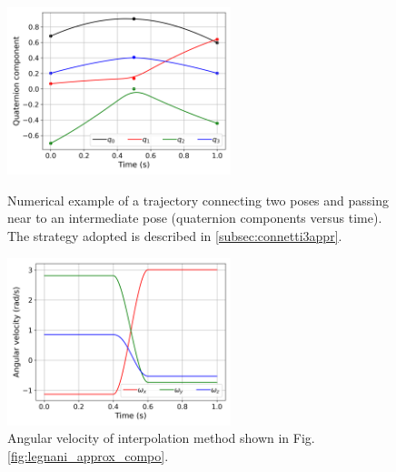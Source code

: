 \begin{figure}[tbp]
    \begin{minipage}[t]{0.49\textwidth}
        \centering
        \includegraphics[width=6.5cm]{figures/legnani_approx_compo.png}
        \caption{Numerical example of a trajectory connecting two poses and passing near to an intermediate pose (quaternion components versus time). The strategy adopted is described in \ref{subsec:connetti3appr}.}
        \label{fig:legnani_approx_compo}
    \end{minipage}
    \hfill
    \begin{minipage}[t]{0.49\textwidth}
        \centering
        \includegraphics[width=6.5cm]{figures/legnani_approx_vel.png}
        \caption{Angular velocity of interpolation method shown in Fig. \ref{fig:legnani_approx_compo}.}
        \label{fig:legnani_approx_vel}
    \end{minipage}
\end{figure}

